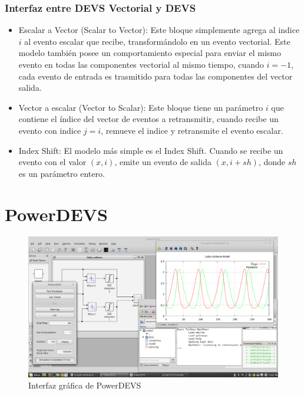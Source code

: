 \documentclass{beamer}
\begin{document}
\subsubsection{Interfaz entre DEVS Vectorial y DEVS}
\begin{frame}
	\begin{itemize}
		\item Escalar a Vector (Scalar to Vector): Este bloque simplemente agrega al indice $i$ al evento escalar que recibe, transformándolo en un 
			evento vectorial. Este modelo también posee un comportamiento especial para enviar el mismo evento en todas las componentes vectorial 
			al mismo tiempo, cuando $i = -1$, cada evento de entrada es trasmitido para todas las componentes del vector salida.
		\item Vector a escalar (Vector to Scalar): Este bloque tiene un parámetro $i$ que contiene el índice del vector de eventos a retransmitir, 
			cuando recibe un evento con indice $j=i$, remueve el indice y retransmite el evento escalar.
		\item Index Shift: El modelo más simple es el Index Shift. Cuando se recibe un evento con el valor $(x,i)$, emite un evento de salida $(x, i+sh)$, 
			donde $sh$ es un parámetro entero.
	\end{itemize}
\end{frame}

\section{PowerDEVS}
\begin{frame}
	\begin{figure}[H]
	  \includegraphics[width=\textwidth]{powerdevs}
	  \caption{Interfaz gráfica de PowerDEVS}
	   \label{fig:powerdevsgui}
	\end{figure}
\end{frame}
\end{document}
